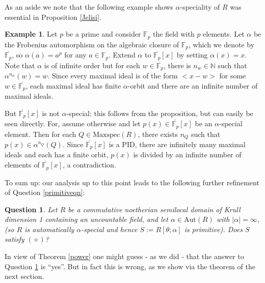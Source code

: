 \documentclass[a4paper, 11pt]{article}
\newtheorem{question}[theorem]{Question}
\theoremstyle{definition}
\newtheorem{ex}[theorem]{Example}
\newcommand{\N}{\mathbb{N}}
\begin{document}
\medskip


As an aside we note that the following example shows $\alpha$-speciality of $R$ was essential in Proposition \ref{Jelisi}.

\begin{ex}

Let $p$ be a prime and consider $\mathbb{F}_p$ the field with $p$ elements. Let $\alpha$ be the Frobenius automorphism on the algebraic closure of $\mathbb{F}_p$, which we denote by $\overline{\mathbb{F}_p}$, so $\alpha(a)=a^p$ for any $a\in \mathbb{F}_p$. Extend $\alpha$ to $\overline{\mathbb{F}_p}[x]$ by setting $\alpha(x)=x$. Note that $\alpha$ is of infinite order but for each $w\in {\overline{\mathbb{F}_p}}$, there is $n_w\in \N$ such that $\alpha^{n_w}(w)=w$.  Since every maximal ideal is of the form $<x-w>$ for some $w\in \overline{\mathbb{F}_p}$, each maximal ideal has finite $\alpha$-orbit and there are an infinite number of maximal ideals.

But ${\overline{\mathbb{F}_p}}[x]$ is not $\alpha$-special: this follows from the proposition, but can easily be seen directly. For, assume otherwise and let $p(x)\in {\overline{\mathbb{F}_p}[x]}$ be an $\alpha$-special element. Then for each $Q\in \mathrm{Maxspec}(R)$, there exists $n_Q$ such that $p(x)\in \alpha^{n_Q}(Q)$. Since ${\overline{\mathbb{F}_p}[x]}$ is a PID, there are infinitely many maximal ideals and each has a finite orbit, $p(x)$ is divided by an infinite number of elements of ${\overline{\mathbb{F}_p}[x]}$, a contradiction.
\end{ex}

\medskip

To sum up: our analysis up to this point leads to the following further refinement of Question \ref{primitiveqn}:

\begin{question}\label{primitiveqn2} Let $R$ be a commutative noetherian semilocal domain of Krull dimension 1 containing an uncountable field, and let $\alpha \in \mathrm{Aut}(R)$ with $|\alpha| = \infty$,  (so $R$ is automatically $\alpha$-special and hence $S := R[\theta ; \alpha]$ is primitive). Does $S$ satisfy $(\diamond)$?
\end{question}

\medskip

In view of Theorem \ref{power} one might guess - as we did - that the answer to Question \ref{primitiveqn2} is ``yes''. But in fact this is wrong, as we show via the theorem of the next section. 
\end{document}
